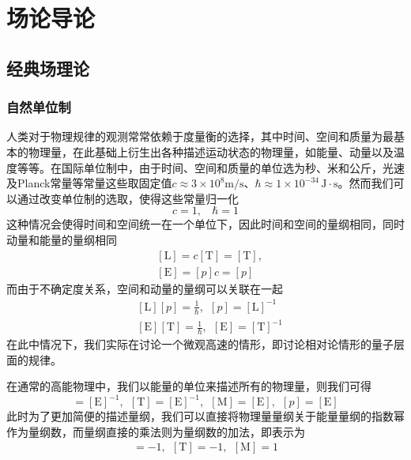 \epigraphhead[650]{}
\part{场论导论}
\chapter{经典场理论}
\section{自然单位制}
人类对于物理规律的观测常常依赖于度量衡的选择，其中时间、空间和质量为最基本的物理量，在此基础上衍生出各种描述运动状态的物理量，如能量、动量以及温度等等。在国际单位制中，由于时间、空间和质量的单位选为秒、米和公斤，光速及Planck常量等常量这些取固定值$c\approx3\times10^8\mathrm{m/s}$、$\hbar\approx1\times10^{-34}\,\mathrm{J\cdot s}$。然而我们可以通过改变单位制的选取，使得这些常量归一化
\begin{equation}
    c = 1,~~~~\hbar = 1
\end{equation}
这种情况会使得时间和空间统一在一个单位下，因此时间和空间的量纲相同，同时动量和能量的量纲相同
\begin{equation}
\begin{split}
    &[\mathrm{L}] = c[\mathrm{T}] = [\mathrm{T}],\\
    &[\mathrm{E}]=[p]c = [p]
\end{split}
\end{equation}
而由于不确定度关系，空间和动量的量纲可以关联在一起
\begin{equation}
\begin{split}
    &[\mathrm{L}] [p] = \frac{1}{\hbar},~~[p] = [\mathrm{L}]^{-1}\\
    &[\mathrm{E}] [\mathrm{T}] = \frac{1}{\hbar},~~[\mathrm{E}] = [\mathrm{T}]^{-1}
\end{split}
\end{equation}
在此中情况下，我们实际在讨论一个微观高速的情形，即讨论相对论情形的量子层面的规律。

在通常的高能物理中，我们以能量的单位来描述所有的物理量，则我们可得
\begin{equation}
    [\mathrm{L}]=[\mathrm{E}]^{-1},~~[\mathrm{T}]=[\mathrm{E}]^{-1},~~[\mathrm{M}] = [\mathrm{E}],~~[p]=[\mathrm{E}]
\end{equation}
此时为了更加简便的描述量纲，我们可以直接将物理量量纲关于能量量纲的指数幂作为量纲数，而量纲直接的乘法则为量纲数的加法，即表示为
\begin{gather}
    [\mathrm{L}] =-1,~~[\mathrm{T}]=-1,~~[\mathrm{M}] =1
\end{gather}

